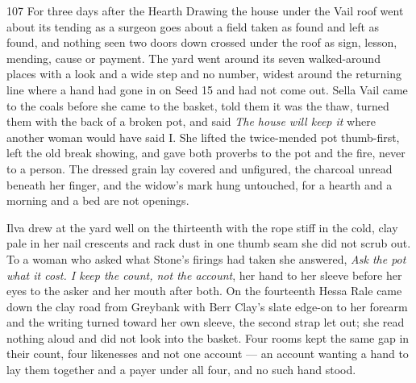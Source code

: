 
\scenebreak


\scenebreak


\scenebreak

\CRtailpiece
\begin{CRchronicle}{107}
For three days after the Hearth Drawing the house under the Vail roof went about its tending as a surgeon goes about a field taken as found and left as found, and nothing seen two doors down crossed under the roof as sign, lesson, mending, cause or payment. The yard went around its seven walked-around places with a look and a wide step and no number, widest around the returning line where a hand had gone in on Seed 15 and had not come out. Sella Vail came to the coals before she came to the basket, told them it was the thaw, turned them with the back of a broken pot, and said \emph{The house will keep it} where another woman would have said I. She lifted the twice-mended pot thumb-first, left the old break showing, and gave both proverbs to the pot and the fire, never to a person. The dressed grain lay covered and unfigured, the charcoal unread beneath her finger, and the widow’s mark hung untouched, for a hearth and a morning and a bed are not openings.

Ilva drew at the yard well on the thirteenth with the rope stiff in the cold, clay pale in her nail crescents and rack dust in one thumb seam she did not scrub out. To a woman who asked what Stone’s firings had taken she answered, \emph{Ask the pot what it cost. I keep the count, not the account}, her hand to her sleeve before her eyes to the asker and her mouth after both. On the fourteenth Hessa Rale came down the clay road from Greybank with Berr Clay’s slate edge-on to her forearm and the writing turned toward her own sleeve, the second strap let out; she read nothing aloud and did not look into the basket. Four rooms kept the same gap in their count, four likenesses and not one account — an account wanting a hand to lay them together and a payer under all four, and no such hand stood.


\end{CRchronicle}
